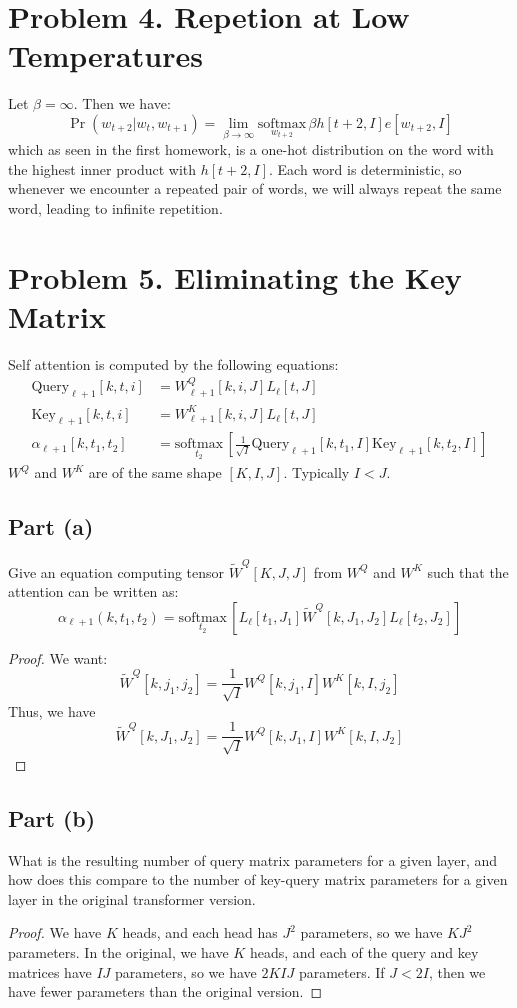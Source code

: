 \documentclass{amsart}
\theoremstyle{definition}
\begin{document}
\section*{Problem 4. Repetion at Low Temperatures}
Let $\beta = \infty$. Then we have:
\[
\Pr(w_{t + 2} | w_{t}, w_{t + 1}) = \lim_{\beta \to \infty} \underset{w_{t + 2}}{\mathrm{softmax}}\,\beta h[t + 2, I] e[w_{t + 2}, I]
\]
which as seen in the first homework, is a one-hot distribution on the word with the highest inner product with $h[t + 2, I]$.
Each word is deterministic, so whenever we encounter a repeated pair of words, we will always repeat the same word, leading to infinite repetition.

\section*{Problem 5. Eliminating the Key Matrix}
Self attention is computed by the following equations:
\begin{align*}
    \mathrm{Query}_{\ell + 1} [k, t, i] &= W^Q_{\ell + 1}[k, i, J] L_{\ell}[t, J] \\
    \mathrm{Key}_{\ell + 1} [k, t, i] &= W^K_{\ell + 1}[k, i, J] L_{\ell}[t, J] \\
    \alpha_{\ell + 1} [k, t_1, t_2] &= \underset{t_2}{\mathrm{softmax}}\, \left[
        \frac1{\sqrt{I}} \mathrm{Query}_{\ell + 1} [k, t_1, I] \mathrm{Key}_{\ell + 1} [k, t_2, I]
    \right]
\end{align*}
$W^Q$ and $W^K$ are of the same shape $[K, I, J]$. Typically $I < J$.
\subsection*{Part (a)} Give an equation computing tensor $\tilde{W}^Q[K, J, J]$ from $W^Q$ and $W^K$ such that the attention can be written as:
\[
\alpha_{\ell + 1} (k, t_1, t_2) = \underset{t_2}{\mathrm{softmax}}\, \left[
    L_{\ell} [t_1, J_1] \tilde{W}^Q [k, J_1, J_2] L_{\ell} [t_2, J_2]
\right]
\]
\begin{proof}
    We want:
    \[
    \tilde{W}^Q[k, j_1, j_2] = \frac1{\sqrt{I}}W^Q[k, j_1, I] W^K[k, I, j_2]
    \]
    Thus, we have 
    \[
    \tilde{W}^Q[k, J_1, J_2] = \frac1{\sqrt{I}}W^Q[k, J_1, I] W^K[k, I, J_2]
    \]
\end{proof}
\subsection*{Part (b)} What is the resulting number of query matrix parameters for a given layer, 
and how does this compare to the number of key-query matrix parameters for a given layer in the original transformer version.
\begin{proof}
    We have $K$ heads, and each head has $J^2$ parameters, so we have $KJ^2$ parameters.
    In the original, we have $K$ heads, and each of the query and key matrices have $IJ$ parameters, so we have $2KIJ$ parameters.
    If $J < 2I$, then we have fewer parameters than the original version.
\end{proof}
\end{document}
